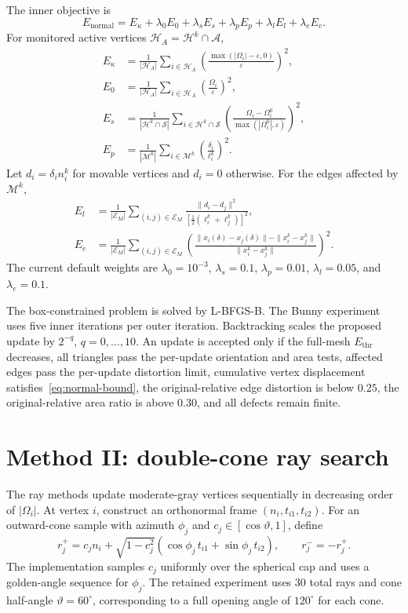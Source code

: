 \documentclass[10pt]{article}
\newcommand{\E}{\mathcal{E}}
\newcommand{\Sset}{\mathcal{S}}
\newcommand{\A}{\mathcal{A}}
\newcommand{\eps}{\varepsilon}
\begin{document}
The inner objective is
\begin{equation}
E_{\mathrm{normal}}=
E_\kappa+\lambda_0E_0+\lambda_sE_s+
\lambda_pE_p+\lambda_lE_l+\lambda_eE_e.
\label{eq:normal-objective}
\end{equation}
For monitored active vertices $\mathcal{H}_A=\mathcal{H}^k\cap\A$,
\begin{align}
E_\kappa &=\frac{1}{|\mathcal{H}_A|}
\sum_{i\in\mathcal{H}_A}
\left(\frac{\max(|\Omega_i|-\eps,0)}{\eps}\right)^2,\\
E_0 &=\frac{1}{|\mathcal{H}_A|}
\sum_{i\in\mathcal{H}_A}\left(\frac{\Omega_i}{\eps}\right)^2,\\
E_s &=\frac{1}{|\mathcal{H}^k\cap\Sset|}
\sum_{i\in\mathcal{H}^k\cap\Sset}
\left(\frac{\Omega_i-\Omega_i^0}{\max(|\Omega_i^0|,\eps)}\right)^2,\\
E_p &=\frac{1}{|\mathcal{M}^k|}
\sum_{i\in\mathcal{M}^k}\left(\frac{\delta_i}{\ell_i^k}\right)^2.
\end{align}
Let $d_i=\delta_i n_i^k$ for movable vertices and $d_i=0$ otherwise.
For the edges affected by $\mathcal{M}^k$,
\begin{align}
E_l &= \frac{1}{|\E_M|}\sum_{(i,j)\in\E_M}
\frac{\|d_i-d_j\|^2}{[\tfrac12(\ell_i^k+\ell_j^k)]^2},\\
E_e &= \frac{1}{|\E_M|}\sum_{(i,j)\in\E_M}
\left(\frac{\|x_i(\delta)-x_j(\delta)\|-\|x_i^k-x_j^k\|}
{\|x_i^k-x_j^k\|}\right)^2.
\end{align}
The current default weights are
$\lambda_0=10^{-3}$, $\lambda_s=0.1$, $\lambda_p=0.01$,
$\lambda_l=0.05$, and $\lambda_e=0.1$.

The box-constrained problem is solved by L-BFGS-B.  The Bunny experiment uses
five inner iterations per outer iteration.  Backtracking scales the proposed
update by $2^{-q}$, $q=0,\ldots,10$.  An update is accepted only if the
full-mesh $E_{\mathrm{thr}}$ decreases, all triangles pass the per-update
orientation and area tests, affected edges pass the per-update distortion
limit, cumulative vertex displacement satisfies~\eqref{eq:normal-bound}, the
original-relative edge distortion is below $0.25$, the original-relative area
ratio is above $0.30$, and all defects remain finite.

\section{Method II: double-cone ray search}

The ray methods update moderate-gray vertices sequentially in decreasing order
of $|\Omega_i|$.  At vertex $i$, construct an orthonormal frame
$(n_i,t_{i1},t_{i2})$.  For an outward-cone sample with azimuth $\phi_j$ and
$c_j\in[\cos\vartheta,1]$, define
\begin{equation}
r_j^+=c_jn_i+\sqrt{1-c_j^2}
(\cos\phi_j\,t_{i1}+\sin\phi_j\,t_{i2}),
\qquad r_j^-=-r_j^+.
\label{eq:cone-rays}
\end{equation}
The implementation samples $c_j$ uniformly over the spherical cap and uses a
golden-angle sequence for $\phi_j$.  The retained experiment uses 30 total rays
and cone half-angle $\vartheta=60^\circ$, corresponding to a full opening angle
of $120^\circ$ for each cone.
\end{document}
